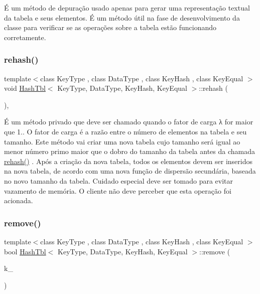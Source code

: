É um método de depuração usado apenas para gerar uma representação textual da tabela e seus elementos. É um método útil na fase de desenvolvimento da classe para verificar se as operações sobre a tabela estão funcionando corretamente. \mbox{\label{classHashTbl_a7cebfea55f49e14efd80cbcb2852171e}} 
\subsubsection{\texorpdfstring{rehash()}{rehash()}}
{\footnotesize\ttfamily template$<$class Key\+Type , class Data\+Type , class Key\+Hash , class Key\+Equal $>$ \\
void \hyperlink{classHashTbl}{Hash\+Tbl}$<$ Key\+Type, Data\+Type, Key\+Hash, Key\+Equal $>$\+::rehash (\begin{DoxyParamCaption}{ }\end{DoxyParamCaption})\hspace{0.3cm}{\ttfamily [inline]}, {\ttfamily [private]}}

É um método privado que deve ser chamado quando o fator de carga λ for maior que 1.. O fator de carga é a razão entre o número de elementos na tabela e seu tamanho. Este método vai criar uma nova tabela cujo tamanho será igual ao menor número primo maior que o dobro do tamanho da tabela antes da chamada \hyperlink{classHashTbl_a7cebfea55f49e14efd80cbcb2852171e}{rehash()} . Após a criação da nova tabela, todos os elementos devem ser inseridos na nova tabela, de acordo com uma nova função de dispersão secundária, baseada no novo tamanho da tabela. Cuidado especial deve ser tomado para evitar vazamento de memória. O cliente não deve perceber que esta operação foi acionada. \mbox{\label{classHashTbl_a8ec97ee89ffce2474fb361f974d5f291}} 
\subsubsection{\texorpdfstring{remove()}{remove()}}
{\footnotesize\ttfamily template$<$class Key\+Type , class Data\+Type , class Key\+Hash , class Key\+Equal $>$ \\
bool \hyperlink{classHashTbl}{Hash\+Tbl}$<$ Key\+Type, Data\+Type, Key\+Hash, Key\+Equal $>$\+::remove (\begin{DoxyParamCaption}\item[{const Key\+Type \&}]{k\+\_\+ }\end{DoxyParamCaption})\hspace{0.3cm}{\ttfamily [inline]}}

